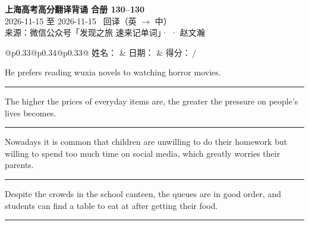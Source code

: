 \documentclass[11pt,a4paper]{article}
\newcommand{\num}[1]{\makebox[1.9em][r]{#1.}\hspace{0.3em}}
\newcommand{\wline}{\noindent\rule{\linewidth}{0.4pt}}
\begin{document}
\pagestyle{plain}
\begin{center}
{\LARGE\bfseries 上海高考高分翻译背诵 \quad 合册 130–130}\\[0.25em]
{\large 2026-11-15 至 2026-11-15 \quad\ 回译（英 $\to$ 中）}\\[0.35em]
{\footnotesize 来源：微信公众号「发现之旅 速来记单词」·  · 赵文瀚}
\end{center}

\vspace{0.4em}
\noindent\begin{tabular}{@{}p{0.33\textwidth}@{}p{0.34\textwidth}@{}p{0.33\textwidth}@{}}
姓名：\underline{\hspace{2.0cm}} & 日期：\underline{\hspace{2.0cm}} & 得分：\underline{\hspace{1.4cm}}\,/ \\
\end{tabular}

\vspace{0.5em}

\vspace{0.8em}
\vspace{0.35em}\vspace{0.15em}

\begin{minipage}{\linewidth}

\num{1}He prefers reading wuxia novels to watching horror movies.

\vspace{0.25em}

\wline

\end{minipage}

\begin{minipage}{\linewidth}

\num{2}The higher the prices of everyday items are, the greater the pressure on people’s lives becomes.

\vspace{0.25em}

\wline

\end{minipage}

\begin{minipage}{\linewidth}

\num{3}Nowadays it is common that children are unwilling to do their homework but willing to spend too much time on social media, which greatly worries their parents.

\vspace{0.25em}

\wline

\end{minipage}

\begin{minipage}{\linewidth}

\num{4}Despite the crowds in the school canteen, the queues are in good order, and students can find a table to eat at after getting their food.

\vspace{0.25em}

\wline

\end{minipage}
\end{document}

